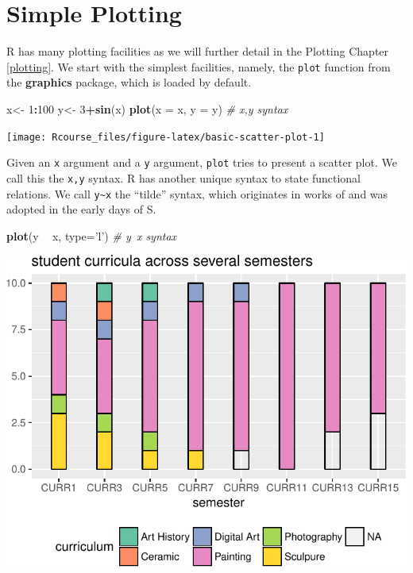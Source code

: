 \documentclass[]{book}
\newenvironment{Shaded}{\begin{snugshade}}{\end{snugshade}}
\newcommand{\CommentTok}[1]{\textcolor[rgb]{0.56,0.35,0.01}{\textit{#1}}}
\newcommand{\DataTypeTok}[1]{\textcolor[rgb]{0.13,0.29,0.53}{#1}}
\newcommand{\DecValTok}[1]{\textcolor[rgb]{0.00,0.00,0.81}{#1}}
\newcommand{\KeywordTok}[1]{\textcolor[rgb]{0.13,0.29,0.53}{\textbf{#1}}}
\newcommand{\NormalTok}[1]{#1}
\newcommand{\OperatorTok}[1]{\textcolor[rgb]{0.81,0.36,0.00}{\textbf{#1}}}
\newcommand{\StringTok}[1]{\textcolor[rgb]{0.31,0.60,0.02}{#1}}
\theoremstyle{definition}
\theoremstyle{definition}
\theoremstyle{definition}
\theoremstyle{remark}
\begin{document}
\hypertarget{simple-plotting}{%
\section{Simple Plotting}\label{simple-plotting}}

R has many plotting facilities as we will further detail in the Plotting Chapter \ref{plotting}.
We start with the simplest facilities, namely, the \texttt{plot} function from the \textbf{graphics} package, which is loaded by default.

\begin{Shaded}
\begin{Highlighting}[]
\NormalTok{x<-}\StringTok{ }\DecValTok{1}\OperatorTok{:}\DecValTok{100}
\NormalTok{y<-}\StringTok{ }\DecValTok{3}\OperatorTok{+}\KeywordTok{sin}\NormalTok{(x) }
\KeywordTok{plot}\NormalTok{(}\DataTypeTok{x =}\NormalTok{ x, }\DataTypeTok{y =}\NormalTok{ y) }\CommentTok{# x,y syntax                         }
\end{Highlighting}
\end{Shaded}

\texttt{[image: Rcourse\_files/figure-latex/basic-scatter-plot-1]}

Given an \texttt{x} argument and a \texttt{y} argument, \texttt{plot} tries to present a scatter plot.
We call this the \texttt{x,y} syntax.
R has another unique syntax to state functional relations.
We call \texttt{y\textasciitilde{}x} the ``tilde'' syntax, which originates in works of \citet{wilkinson1973symbolic} and was adopted in the early days of S.

\begin{Shaded}
\begin{Highlighting}[]
\KeywordTok{plot}\NormalTok{(y }\OperatorTok{~}\StringTok{ }\NormalTok{x, }\DataTypeTok{type=}\StringTok{'l'}\NormalTok{) }\CommentTok{# y~x syntax }
\end{Highlighting}
\end{Shaded}

\includegraphics[width=0.5\linewidth]{Rcourse_files/figure-latex/unnamed-chunk-32-1}
\end{document}
